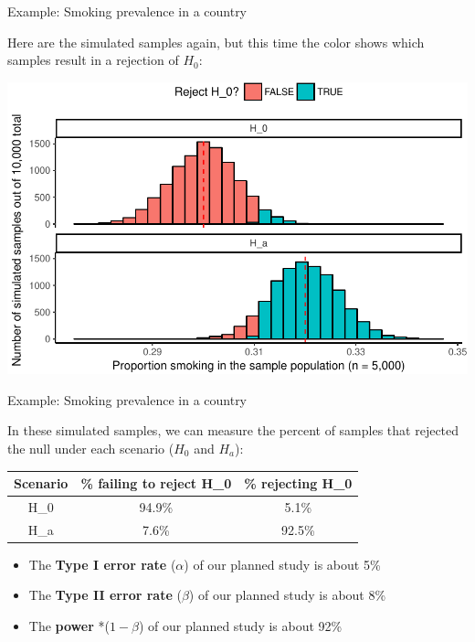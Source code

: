 \documentclass[ignorenonframetext,]{beamer}
\providecommand{\tightlist}{%
  \setlength{\itemsep}{0pt}\setlength{\parskip}{0pt}}
\begin{document}
\begin{frame}{Example: Smoking prevalence in a country}

Here are the simulated samples again, but this time the color shows
which samples result in a rejection of \(H_0\):

\begin{center}\includegraphics[height=0.7\textheight]{sample_size_files/figure-beamer/unnamed-chunk-2-1} \end{center}

\end{frame}

\begin{frame}{Example: Smoking prevalence in a country}

In these simulated samples, we can measure the percent of samples that
rejected the null under each scenario (\(H_0\) and \(H_a\)):

\begin{longtable}[]{@{}ccc@{}}
\toprule
Scenario & \% failing to reject H\_0 & \% rejecting H\_0\tabularnewline
\midrule
\endhead
H\_0 & 94.9\% & 5.1\%\tabularnewline
H\_a & 7.6\% & 92.5\%\tabularnewline
\bottomrule
\end{longtable}

\begin{itemize}
\tightlist
\item
  The \textbf{Type I error rate} (\(\alpha\)) of our planned study is
  about 5\%
\item
  The \textbf{Type II error rate} (\(\beta\)) of our planned study is
  about 8\%
\item
  The \textbf{power} *(\(1 - \beta\)) of our planned study is about 92\%
\end{itemize}

\end{frame}
\end{document}
